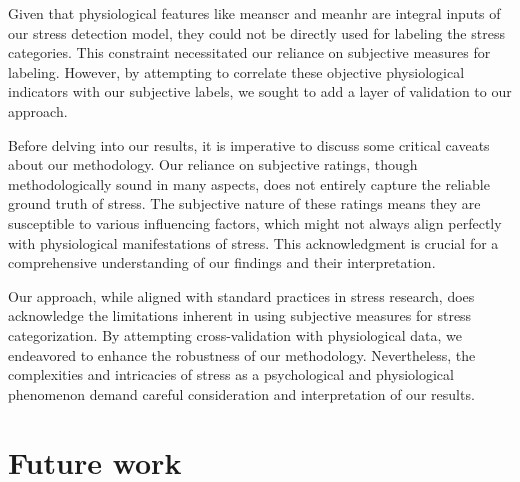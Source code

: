 Given that physiological features like meanscr and meanhr are integral inputs of our stress detection model, they could not be directly used for labeling the stress categories. This constraint necessitated our reliance on subjective measures for labeling. However, by attempting to correlate these objective physiological indicators with our subjective labels, we sought to add a layer of validation to our approach.


Before delving into our results, it is imperative to discuss some critical caveats about our methodology. Our reliance on subjective ratings, though methodologically sound in many aspects, does not entirely capture the reliable ground truth of stress. The subjective nature of these ratings means they are susceptible to various influencing factors, which might not always align perfectly with physiological manifestations of stress. This acknowledgment is crucial for a comprehensive understanding of our findings and their interpretation.


Our approach, while aligned with standard practices in stress research, does acknowledge the limitations inherent in using subjective measures for stress categorization. By attempting cross-validation with physiological data, we endeavored to enhance the robustness of our methodology. Nevertheless, the complexities and intricacies of stress as a psychological and physiological phenomenon demand careful consideration and interpretation of our results.


\section{Future work}

